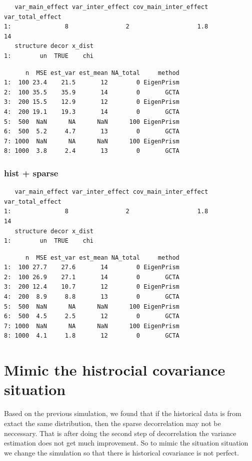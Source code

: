 \documentclass[]{article}
\begin{document}
\begin{verbatim}
   var_main_effect var_inter_effect cov_main_inter_effect var_total_effect
1:               8                2                   1.8               14
   structure decor x_dist
1:        un  TRUE    chi
\end{verbatim}

\begin{verbatim}
      n  MSE est_var est_mean NA_total     method
1:  100 23.4    21.5       12        0 EigenPrism
2:  100 35.5    35.9       14        0       GCTA
3:  200 15.5    12.9       12        0 EigenPrism
4:  200 19.1    19.3       14        0       GCTA
5:  500  NaN      NA      NaN      100 EigenPrism
6:  500  5.2     4.7       13        0       GCTA
7: 1000  NaN      NA      NaN      100 EigenPrism
8: 1000  3.8     2.4       13        0       GCTA
\end{verbatim}

\subsubsection{hist + sparse}\label{hist-sparse-1}

\begin{verbatim}
   var_main_effect var_inter_effect cov_main_inter_effect var_total_effect
1:               8                2                   1.8               14
   structure decor x_dist
1:        un  TRUE    chi
\end{verbatim}

\begin{verbatim}
      n  MSE est_var est_mean NA_total     method
1:  100 27.7    27.6       14        0 EigenPrism
2:  100 26.9    27.1       14        0       GCTA
3:  200 12.4    10.7       12        0 EigenPrism
4:  200  8.9     8.8       13        0       GCTA
5:  500  NaN      NA      NaN      100 EigenPrism
6:  500  4.5     2.5       12        0       GCTA
7: 1000  NaN      NA      NaN      100 EigenPrism
8: 1000  4.1     1.8       12        0       GCTA
\end{verbatim}

\section{Mimic the histrocial covariance
situation}\label{mimic-the-histrocial-covariance-situation}

Based on the previous simulation, we found that if the historical data
is from extact the same distribution, then the sparse decorrelation may
not be neccessary. That is after doing the second step of decorrelation
the variance estimation does not get much improvement. So to mimic the
situation situation we change the simulation so that there is historical
covariance is not perfect.
\end{document}
